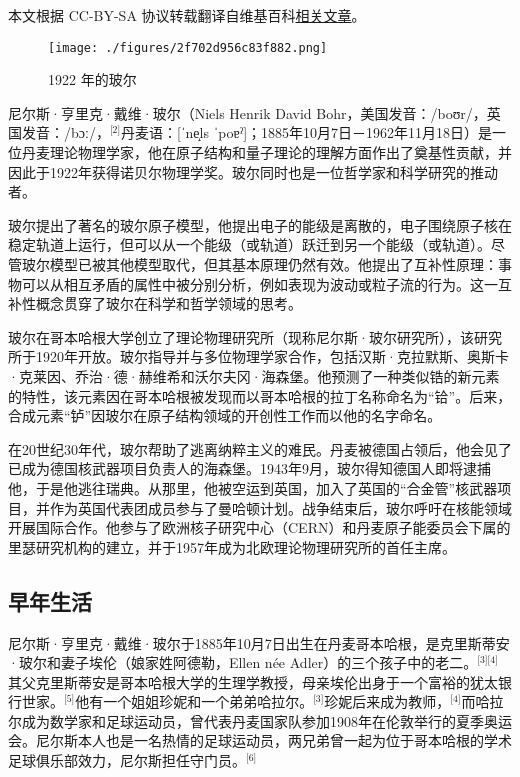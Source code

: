 
本文根据 CC-BY-SA 协议转载翻译自维基百科\href{https://en.wikipedia.org/wiki/Niels_Bohr}{相关文章}。

\begin{figure}[ht]
\centering
\texttt{[image: ./figures/2f702d956c83f882.png]}
\caption{1922 年的玻尔} \label{fig_NRSbr_3}
\end{figure}
尼尔斯·亨里克·戴维·玻尔（Niels Henrik David Bohr，美国发音：/boʊr/，英国发音：/bɔː/，\(^\text{[2]}\)丹麦语：[ˈne̝ls ˈpoɐˀ]；1885年10月7日－1962年11月18日）是一位丹麦理论物理学家，他在原子结构和量子理论的理解方面作出了奠基性贡献，并因此于1922年获得诺贝尔物理学奖。玻尔同时也是一位哲学家和科学研究的推动者。

玻尔提出了著名的玻尔原子模型，他提出电子的能级是离散的，电子围绕原子核在稳定轨道上运行，但可以从一个能级（或轨道）跃迁到另一个能级（或轨道）。尽管玻尔模型已被其他模型取代，但其基本原理仍然有效。他提出了互补性原理：事物可以从相互矛盾的属性中被分别分析，例如表现为波动或粒子流的行为。这一互补性概念贯穿了玻尔在科学和哲学领域的思考。

玻尔在哥本哈根大学创立了理论物理研究所（现称尼尔斯·玻尔研究所），该研究所于1920年开放。玻尔指导并与多位物理学家合作，包括汉斯·克拉默斯、奥斯卡·克莱因、乔治·德·赫维希和沃尔夫冈·海森堡。他预测了一种类似锆的新元素的特性，该元素因在哥本哈根被发现而以哥本哈根的拉丁名称命名为“铪”。后来，合成元素“𬬻”因玻尔在原子结构领域的开创性工作而以他的名字命名。

在20世纪30年代，玻尔帮助了逃离纳粹主义的难民。丹麦被德国占领后，他会见了已成为德国核武器项目负责人的海森堡。1943年9月，玻尔得知德国人即将逮捕他，于是他逃往瑞典。从那里，他被空运到英国，加入了英国的“合金管”核武器项目，并作为英国代表团成员参与了曼哈顿计划。战争结束后，玻尔呼吁在核能领域开展国际合作。他参与了欧洲核子研究中心（CERN）和丹麦原子能委员会下属的里瑟研究机构的建立，并于1957年成为北欧理论物理研究所的首任主席。
\subsection{早年生活}
尼尔斯·亨里克·戴维·玻尔于1885年10月7日出生在丹麦哥本哈根，是克里斯蒂安·玻尔和妻子埃伦（娘家姓阿德勒，Ellen née Adler）的三个孩子中的老二。\(^\text{[3][4]}\)其父克里斯蒂安是哥本哈根大学的生理学教授，母亲埃伦出身于一个富裕的犹太银行世家。\(^\text{[5]}\)他有一个姐姐珍妮和一个弟弟哈拉尔。\(^\text{[3]}\)珍妮后来成为教师，\(^\text{[4]}\)而哈拉尔成为数学家和足球运动员，曾代表丹麦国家队参加1908年在伦敦举行的夏季奥运会。尼尔斯本人也是一名热情的足球运动员，两兄弟曾一起为位于哥本哈根的学术足球俱乐部效力，尼尔斯担任守门员。\(^\text{[6]}\)

